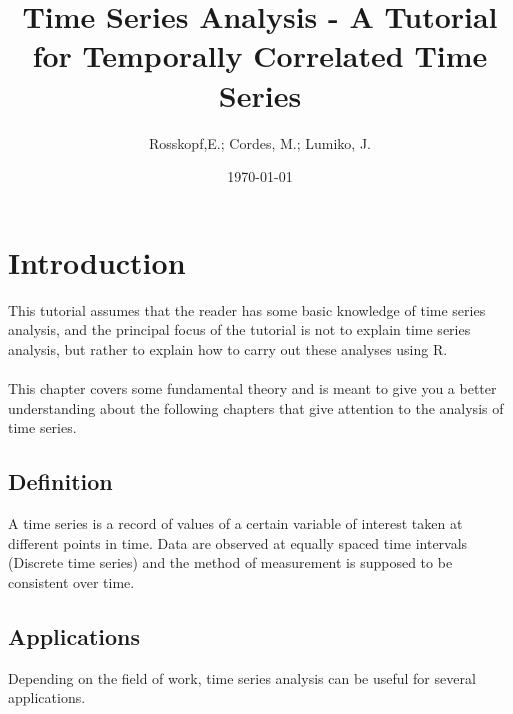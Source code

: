 \documentclass[10pt, a4paper]{article} %
\begin{document}

\title{Time Series Analysis - A Tutorial \\
for Temporally Correlated Time Series}
\author{Rosskopf,E.; Cordes, M.; Lumiko, J.}
\date{\today} %
\maketitle
\tableofcontents
\pagebreak


\section{Introduction}%
\noindent This tutorial assumes that the reader has some basic knowledge of time series analysis, and the principal focus of the tutorial is not to explain time series analysis, but rather to explain how to carry out these analyses using R.\\
\\This chapter covers some fundamental theory and is meant to give you a better understanding about the following chapters that give attention to the analysis of time series. 

\subsection{Definition}
\noindent A time series is a record of values of a certain variable of interest taken at different points in time. Data are observed at equally spaced time intervals (Discrete time series) and the method of measurement is supposed to be consistent over time.\\

\subsection{Applications}

\noindent Depending on the field of work, time series analysis can be useful for several applications.\\
\end{document}
